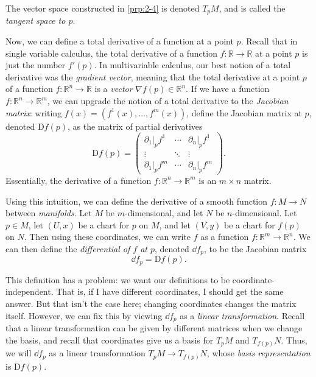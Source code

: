 \begin{definition}\label{dfn:2-5}
	The vector space constructed in \cref{prp:2-4} is denoted $T_pM$, and is called the \emph{tangent space to $p$}.
\end{definition}

Now, we can define a total derivative of a function at a point $p$. Recall that in single variable calculus, the total derivative of a function $f : \mathbb{R}  \to \mathbb{R} $ at a point $p$ is just the number $f'(p)$. In multivariable calculus, our best notion of a total derivative was the \emph{gradient vector}, meaning that the total derivative at a point $p$ of a function $f : \mathbb{R} ^n \to \mathbb{R} $ is a \emph{vector} $\nabla f(p)\in\mathbb{R} ^n$. If we have a function $f : \mathbb{R} ^n \to \mathbb{R}^m$, we can upgrade the notion of a total derivative to the \emph{Jacobian matrix}: writing $f(x) = (f^1(x), \ldots , f^m(x))$, define the Jacobian matrix at $p$, denoted $\mathrm{D} f(p)$, as the matrix of partial derivatives
\[
	\mathrm{D} f(p) = \begin{pmatrix}
	\partial _1|_pf^1 & \cdots  & \partial _n|_pf^1 \\
	\vdots & \ddots & \vdots \\
	\partial _1|_pf^m & \cdots  & \partial _n|_pf^m
	\end{pmatrix}
.\]
Essentially, the derivative of a function $f : \mathbb{R} ^n \to \mathbb{R} ^m$ is an $m\times n$ matrix.

Using this intuition, we can define the derivative of a smooth function $f : M \to N$ between \emph{manifolds}. Let $M$ be $m$-dimensional, and let $N$ be $n$-dimensional. Let $p\in M$, let $(U,x)$ be a chart for $p$ on $M$, and let $(V,y)$ be a chart for $f(p)$ on $N$. Then using these coordinates, we can write $f$ as a function $f : \mathbb{R} ^m \to \mathbb{R} ^n$. We can then define the \emph{differential of $f$ at $p$}, denoted $\dd f_p$, to be the Jacobian matrix
\[
	\dd f_p = \mathrm{D} f(p)
.\]

This definition has a problem: we want our definitions to be coordinate-independent. That is, if I have different coordinates, I should get the same answer. But that isn't the case here; changing coordinates changes the matrix itself. However, we can fix this by viewing $\dd f_p$ as a \emph{linear transformation}. Recall that a linear transformation can be given by different matrices when we change the basis, and recall that coordinates give us a basis for $T_pM$ and $T_{f(p)} N$. Thus, we will $\dd f_p$ as a linear transformation $T_pM \to T_{f(p)} N$, whose \emph{basis representation} is $\mathrm{D} f(p)$.

